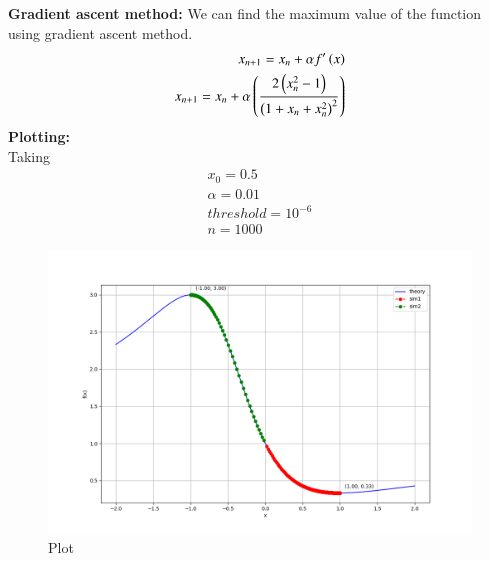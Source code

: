 \documentclass[journal]{IEEEtran}
\begin{document}
\textbf{Gradient ascent method:} We can find the maximum value of the function using gradient ascent method.
\begin{align}
x_{n+1}=x_n+\alpha f^\prime\left(x\right)\\
x_{n+1}=x_n+\alpha\left(\frac{2\left(x_n^2-1\right)}{\left(1+x_n+x_n^2\right)^2}\right)
\end{align}
\textbf{Plotting:}\\
Taking 
\begin{align}
x_0=0.5\\
\alpha=0.01\\
threshold=10^{-6}\\
n=1000
\end{align}
\begin{figure}[h!]
   \centering
   \includegraphics[width=1\columnwidth]{Figs/Figure_1.png}
   \caption{Plot}
\end{figure}
\end{document}

